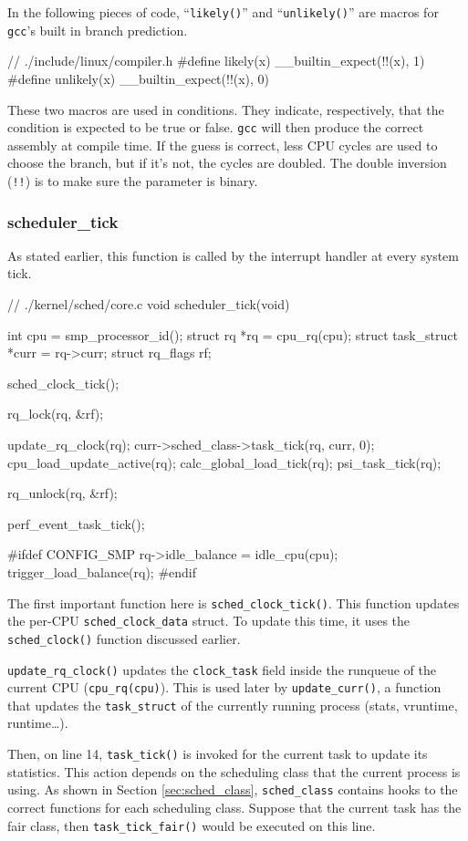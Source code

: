 In the following pieces of code, ``\verb|likely()|'' and ``\verb|unlikely()|'' are macros for \verb|gcc|'s built in branch prediction.
\begin{code}
// ./include/linux/compiler.h
#define likely(x)       __builtin_expect(!!(x), 1)
#define unlikely(x)     __builtin_expect(!!(x), 0)
\end{code}
These two macros are used in conditions. They indicate, respectively, that the condition is expected to be true or false. \verb|gcc| will then produce the correct assembly at compile time. If the guess is correct, less CPU cycles are used to choose the branch, but if it's not, the cycles are doubled. The double inversion (\verb|!!|) is to make sure the parameter is binary.

\subsubsection{scheduler\_tick}
As stated earlier, this function is called by the interrupt handler at every system tick.

\begin{code}
// ./kernel/sched/core.c
void scheduler_tick(void)
{
	int cpu = smp_processor_id();
	struct rq *rq = cpu_rq(cpu);
	struct task_struct *curr = rq->curr;
	struct rq_flags rf;

	sched_clock_tick();

	rq_lock(rq, &rf);

	update_rq_clock(rq);
	curr->sched_class->task_tick(rq, curr, 0);
	cpu_load_update_active(rq);
	calc_global_load_tick(rq);
	psi_task_tick(rq);

	rq_unlock(rq, &rf);

	perf_event_task_tick();

#ifdef CONFIG_SMP
	rq->idle_balance = idle_cpu(cpu);
	trigger_load_balance(rq);
#endif
}
\end{code}
The first important function here is \verb|sched_clock_tick()|. This function updates the per-CPU \verb|sched_clock_data| struct. To update this time, it uses the \verb|sched_clock()| function discussed earlier.

\verb|update_rq_clock()| updates the \verb|clock_task| field inside the runqueue of the current CPU (\verb|cpu_rq(cpu)|). This is used later by \verb|update_curr()|, a function that updates the \verb|task_struct| of the currently running process (stats, vruntime, runtime\dots).

Then, on line 14, \verb|task_tick()| is invoked for the current task to update its statistics. This action depends on the scheduling class that the current process is using. As shown in Section \ref{sec:sched_class}, \verb|sched_class| contains hooks to the correct functions for each scheduling class. Suppose that the current task has the fair class, then \verb|task_tick_fair()| would be executed on this line.

